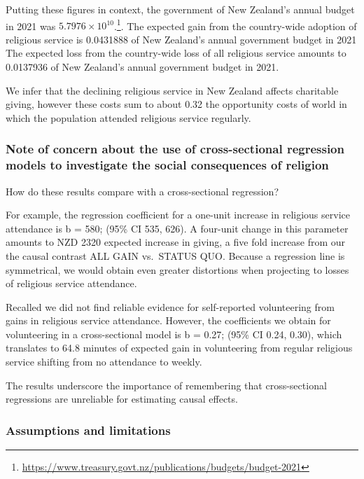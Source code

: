 \documentclass[
  singlecolumn]{article}
\begin{document}
Putting these figures in context, the government of New Zealand's annual
budget in 2021 was \ensuremath{5.7976\times 10^{10}}.\footnote{\url{https://www.treasury.govt.nz/publications/budgets/budget-2021}}.
The expected gain from the country-wide adoption of religious service is
0.0431888 of New Zealand's annual government budget in 2021 The expected
loss from the country-wide loss of all religious service amounts to
0.0137936 of New Zealand's annual government budget in 2021.

We infer that the declining religious service in New Zealand affects
charitable giving, however these costs sum to about 0.32 the opportunity
costs of world in which the population attended religious service
regularly.

\subsubsection{Note of concern about the use of cross-sectional
regression models to investigate the social consequences of
religion}\label{note-of-concern-about-the-use-of-cross-sectional-regression-models-to-investigate-the-social-consequences-of-religion}

How do these results compare with a cross-sectional regression?

For example, the regression coefficient for a one-unit increase in
religious service attendance is b = 580; (95\% CI 535, 626). A four-unit
change in this parameter amounts to NZD 2320 expected increase in
giving, a five fold increase from our the causal contrast ALL GAIN
vs.~STATUS QUO. Because a regression line is symmetrical, we would
obtain even greater distortions when projecting to losses of religious
service attendance.

Recalled we did not find reliable evidence for self-reported
volunteering from gains in religious service attendance. However, the
coefficients we obtain for volunteering in a cross-sectional model is b
= 0.27; (95\% CI 0.24, 0.30), which translates to 64.8 minutes of
expected gain in volunteering from regular religious service shifting
from no attendance to weekly.

The results underscore the importance of remembering that
cross-sectional regressions are unreliable for estimating causal
effects.

\subsubsection{Assumptions and
limitations}\label{assumptions-and-limitations}
\end{document}
